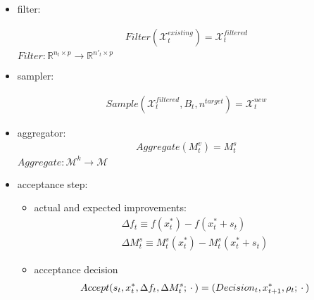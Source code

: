 \begin{itemize}
\begin{itemize}
            \item filter:

            \begin{align}
                Filter(\mathcal{X}_t^{existing})=\mathcal{X}_t^{filtered}
            \end{align}
                        $Filter: \mathbb{R}^{n_t\times p}\rightarrow\mathbb{R}^{n{'}_t\times p}$
            \item sampler:

            \begin{align}
                Sample(\mathcal{X}_t^{filtered},B_t,n^{target})=\mathcal{X}_t^{new}
            \end{align}
            \item aggregator:
                \begin{align}
                    Aggregate(M_t^{v})=M_t^{s}
                \end{align}
                $Aggregate:\mathcal{M}^k\rightarrow\mathcal{M}$
            \item acceptance step:
            \begin{itemize}
                \item actual and expected improvements:
                    \begin{align}
                        \Delta f_t\equiv f(x_t^*)-f(x^*_t+s_t )\\
                        \Delta M^s_t\equiv M_t^s(x_t^*)-M_t^s(x^*_t+s_t )
                    \end{align}
                \item acceptance decision
                    \begin{align}
                        Accept(s_t,x_t^{*},\Delta f_t,\Delta M_t^s;\hspace{0.2em}\cdot\hspace{0.2em})=(Decision_t,x_{t+1}^{*},\rho_t;\hspace{0.2em}\cdot\hspace{0.2em})
                    \end{align}
            \end{itemize}


\end{itemize}
\end{itemize}
